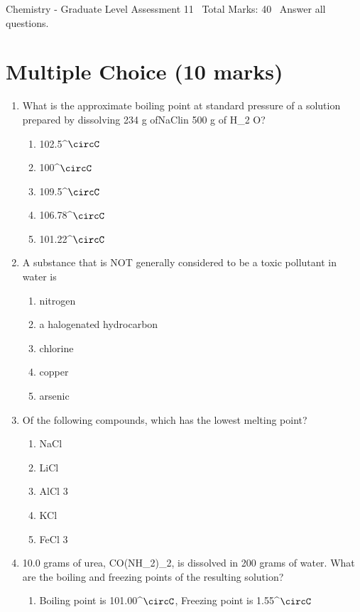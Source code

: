 \documentclass[12pt]{article}
\begin{document}
\begin{center}
Chemistry - Graduate Level Assessment 11 \
Total Marks: 40 \
Answer all questions.
\end{center}

\section*{Multiple Choice (10 marks)}
\begin{enumerate}[label=\arabic*.]
\item What is the approximate boiling point at standard pressure of a solution prepared by dissolving 234 g ofNaClin 500 g of H\_2 O?
\begin{enumerate}[label=(\alph*)]
    \item 102.5^\ensuremath{\circC}
    \item 100^\ensuremath{\circC}
    \item 109.5^\ensuremath{\circC}
    \item 106.78^\ensuremath{\circC}
    \item 101.22^\ensuremath{\circC}
\end{enumerate}
\item A substance that is NOT generally considered to be a toxic pollutant in water is
\begin{enumerate}[label=(\alph*)]
    \item nitrogen
    \item a halogenated hydrocarbon
    \item chlorine
    \item copper
    \item arsenic
\end{enumerate}
\item Of the following compounds, which has the lowest melting point?
\begin{enumerate}[label=(\alph*)]
    \item NaCl
    \item LiCl
    \item AlCl 3
    \item KCl
    \item FeCl 3
\end{enumerate}
\item 10.0 grams of urea, CO(NH\_2)\_2, is dissolved in 200 grams of water. What are the boiling and freezing points of the resulting solution?
\begin{enumerate}[label=(\alph*)]
    \item Boiling point is 101.00^\ensuremath{\circC}, Freezing point is 1.55^\ensuremath{\circC}

\end{enumerate}
\end{enumerate}
\end{document}
